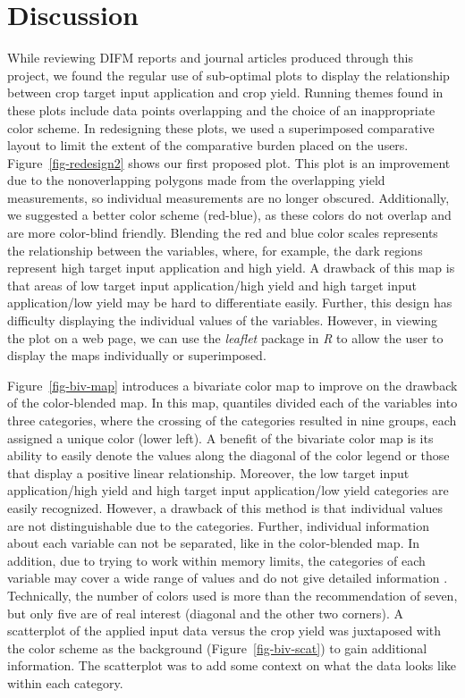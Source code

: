 \documentclass[
  authoryear,
  preprint,
  3p]{elsarticle}
\begin{document}
\hypertarget{discussion}{%
\section{Discussion}\label{discussion}}

While reviewing DIFM reports and journal articles produced through this
project, we found the regular use of sub-optimal plots to display the
relationship between crop target input application and crop yield.
Running themes found in these plots include data points overlapping and
the choice of an inappropriate color scheme. In redesigning these plots,
we used a superimposed comparative layout to limit the extent of the
comparative burden placed on the users. Figure~\ref{fig-redesign2} shows
our first proposed plot. This plot is an improvement due to the
nonoverlapping polygons made from the overlapping yield measurements, so
individual measurements are no longer obscured. Additionally, we
suggested a better color scheme (red-blue), as these colors do not
overlap and are more color-blind friendly. Blending the red and blue
color scales represents the relationship between the variables, where,
for example, the dark regions represent high target input application
and high yield. A drawback of this map is that areas of low target input
application/high yield and high target input application/low yield may
be hard to differentiate easily. Further, this design has difficulty
displaying the individual values of the variables. However, in viewing
the plot on a web page, we can use the \emph{leaflet} package in
\emph{R} to allow the user to display the maps individually or
superimposed.

Figure~\ref{fig-biv-map} introduces a bivariate color map to improve on
the drawback of the color-blended map. In this map, quantiles divided
each of the variables into three categories, where the crossing of the
categories resulted in nine groups, each assigned a unique color (lower
left). A benefit of the bivariate color map is its ability to easily
denote the values along the diagonal of the color legend or those that
display a positive linear relationship. Moreover, the low target input
application/high yield and high target input application/low yield
categories are easily recognized. However, a drawback of this method is
that individual values are not distinguishable due to the categories.
Further, individual information about each variable can not be
separated, like in the color-blended map. In addition, due to trying to
work within memory limits, the categories of each variable may cover a
wide range of values and do not give detailed information
\citep{roth-2017}. Technically, the number of colors used is more than
the recommendation of seven, but only five are of real interest
(diagonal and the other two corners). A scatterplot of the applied input
data versus the crop yield was juxtaposed with the color scheme as the
background (Figure~\ref{fig-biv-scat}) to gain additional information.
The scatterplot was to add some context on what the data looks like
within each category.
\end{document}
